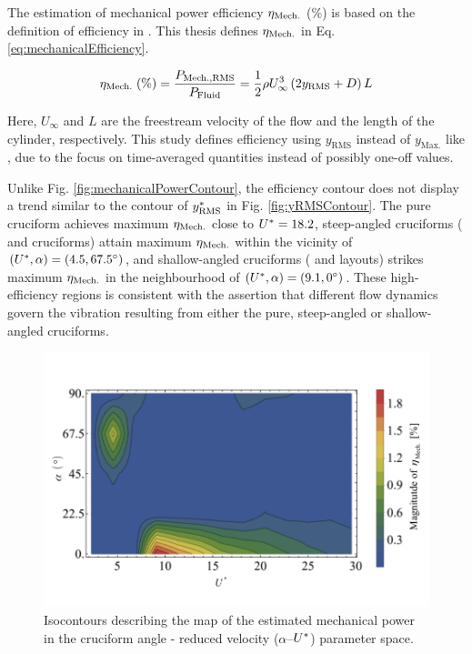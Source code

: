 \documentclass[oneside]{utmthesis}
\begin{document}
The estimation of mechanical power efficiency $\eta_{\text{Mech.}}$ (\%) is based on the definition of efficiency in \citet{Sun2018}. This thesis defines $\eta_{\text{Mech.}}$ in Eq. \ref{eq:mechanicalEfficiency}.

\begin{equation}
  \eta_{\text{Mech.}} \;(\%) = \frac{P_{\text{Mech.,RMS}}}{P_{\text{Fluid}}} = \frac{1}{2}\rho U^{3}_{\infty} \left( 2 y_{\text{RMS}} + D \right) L
  \label{eq:mechanicalEfficiency}
\end{equation}

\noindent Here, $U_{\infty}$ and $L$ are the freestream velocity of the flow and the length of the cylinder, respectively. This study defines efficiency using $y_{\text{RMS}}$ instead of $y_{\text{Max.}}$ like \citet{Sun2018}, due to the focus on time-averaged quantities instead of possibly one-off values.

Unlike Fig. \ref{fig:mechanicalPowerContour}, the efficiency contour does not display a trend similar to the contour of $y^{*}_{\text{RMS}}$ in Fig. \ref{fig:yRMSContour}. The pure cruciform achieves maximum $\eta_{\text{Mech.}}$ close to $U^{*} = 18.2$, steep-angled cruciforms (\angfo{} and \angth{} cruciforms) attain maximum $\eta_{\text{Mech.}}$ within the vicinity of $(\ured,\alpha) = (\urtw,\angfo)$, and shallow-angled cruciforms (\angtw{} and \angon{} layouts) strikes maximum $\eta_{\text{Mech.}}$ in the neighbourhood of $(\ured,\alpha) = (\urfo,\angon)$. These high-efficiency regions is consistent with the assertion that different flow dynamics govern the vibration resulting from either the pure, steep-angled or shallow-angled cruciforms.

\begin{figure}
  \centering
  \includegraphics[width=1\textwidth]{figs/powerEfficiencyContours}
  \caption{Isocontours describing the map of the estimated mechanical power in the cruciform angle - reduced velocity ($\alpha$--$U^{*}$) parameter space.}
  \label{fig:powerEfficiencyContour}
\end{figure}
\end{document}
